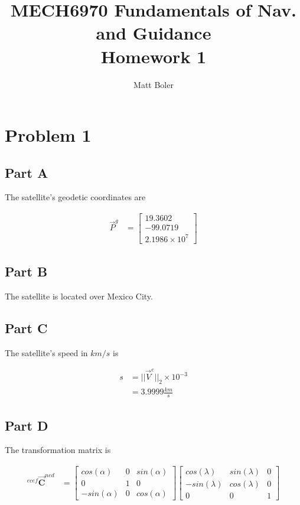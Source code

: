 \documentclass[]{article}
\title{MECH6970 Fundamentals of Nav. and Guidance \\ Homework 1}
\author{Matt Boler}
\begin{document}
\maketitle



\section{Problem 1}

\subsection{Part A}

The satellite's geodetic coordinates are 

\begin{align*}
	\overrightarrow{P}^g &= \begin{bmatrix}
	19.3602 \\
	-99.0719 \\
	2.1986 \times 10^7
	\end{bmatrix}
\end{align*}

\subsection{Part B}

The satellite is located over Mexico City.

\subsection{Part C}

The satellite's speed in $km/s$ is

\begin{align*}
	s &= || \overrightarrow{V}^e ||_2 \times 10^{-3} \\
	&= 3.9999 \frac{km}{s}
\end{align*}

\subsection{Part D}

The transformation matrix is

\begin{align*}
	^{ecef}\overrightarrow{\mathbf{C}}^{ned} &= \begin{bmatrix}
	cos(\alpha) & 0 & sin(\alpha) \\
	0 & 1 & 0 \\
	-sin(\alpha) & 0 & cos(\alpha)
	\end{bmatrix} \begin{bmatrix}
	cos(\lambda) & sin(\lambda) & 0 \\
	-sin(\lambda) & cos(\lambda) & 0 \\
	0 & 0 & 1
	\end{bmatrix}
\end{align*}
\end{document}

